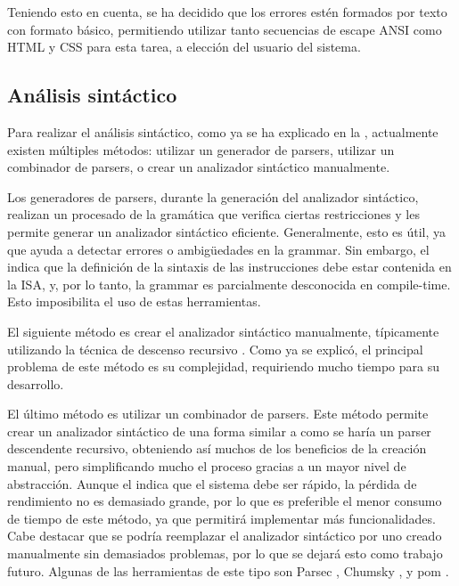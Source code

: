 Teniendo esto en cuenta, se ha decidido que los errores estén formados por texto
con formato básico, permitiendo utilizar tanto secuencias de escape ANSI como
\gls{HTML} y \gls{CSS} para esta tarea, a elección del usuario del sistema.

\subsection{Análisis sintáctico}\label{subsec:parser}

Para realizar el análisis sintáctico, como ya se ha explicado en la
, actualmente existen múltiples métodos: utilizar
un generador de \glspl{parser}, utilizar un combinador de \glspl{parser}, o
crear un analizador sintáctico manualmente. \parencite{dragon-book}
\parencite{parser-combinators}

Los generadores de \glspl{parser}, durante la generación del analizador
sintáctico, realizan un procesado de la gramática que verifica ciertas
restricciones y les permite generar un analizador sintáctico eficiente.
Generalmente, esto es útil, ya que ayuda a detectar errores o ambigüedades en la
\gls{grammar}. Sin embargo, el  indica que la
definición de la sintaxis de las instrucciones debe estar contenida en la
\gls{ISA}, y, por lo tanto, la \gls{grammar} es parcialmente desconocida en
\gls{compile-time}. Esto imposibilita el uso de estas herramientas.

El siguiente método es crear el analizador sintáctico manualmente, típicamente
utilizando la técnica de descenso recursivo \parencite{dragon-book}. Como ya se
explicó, el principal problema de este método es su complejidad, requiriendo
mucho tiempo para su desarrollo.

El último método es utilizar un combinador de \glspl{parser}. Este método
permite crear un analizador sintáctico de una forma similar a como se haría un
\gls{parser} descendente recursivo, obteniendo así muchos de los beneficios de
la creación manual, pero simplificando mucho el proceso gracias a un mayor nivel
de abstracción. Aunque el  indica que el sistema debe ser
rápido, la pérdida de rendimiento no es demasiado grande, por lo que es
preferible el menor consumo de tiempo de este método, ya que permitirá
implementar más funcionalidades. Cabe destacar que se podría reemplazar el
analizador sintáctico por uno creado manualmente sin demasiados problemas, por
lo que se dejará esto como trabajo futuro. Algunas de las herramientas de este
tipo son Parsec \parencite{parsec}, Chumsky \parencite{chumsky}, y pom
\parencite{pom}.

